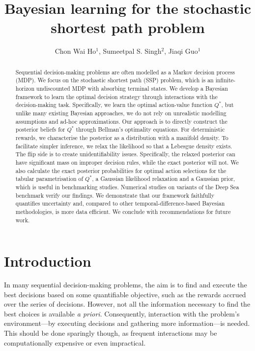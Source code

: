 \documentclass{amsart}
\begin{document}
\title{Bayesian learning for the stochastic shortest path problem}
\author{Chon Wai Ho$^1$, Sumeetpal S. Singh$^2$, Jiaqi Guo$^1$}

\address{$^1$Department of Engineering, University of Cambridge, UK}
\address{$^2$School of Mathematics and Physics, University
 of Wollongong, Wollongong, Australia}

\begin{abstract}

 Sequential decision-making problems are often modelled as a Markov decision process (MDP). We focus on the stochastic shortest path (SSP) problem, which is an infinite-horizon undiscounted MDP with absorbing terminal states. We develop a Bayesian framework to learn the optimal decision strategy through interactions with the decision-making task. Specifically, we learn the optimal action-value function $Q^*$, but unlike many existing Bayesian approaches, we do not rely on unrealistic modelling assumptions and ad-hoc approximations. Our approach is to directly construct the posterior beliefs for $Q^*$ through  Bellman's optimality equations. For deterministic rewards, we characterise the posterior as a distribution with a manifold density. To facilitate simpler inference, we relax the likelihood so that a Lebesgue density exists. The flip side is to create unidentifiability issues. Specifically, the relaxed posterior can have
significant mass on improper decision rules, while the exact posterior will not. 
 We also calculate the exact posterior probabilities for optimal action selections for the tabular parametrisation of $Q^*$, a Gaussian likelihood relaxation and a Gaussian prior, which is useful in benchmarking studies. Numerical studies on variants of the Deep Sea benchmark verify our findings. We demonstrate that our framework faithfully quantifies uncertainty and, compared to other temporal-difference-based Bayesian methodologies, is more data efficient. We conclude with recommendations for future work.
\end{abstract}

\maketitle


\section{Introduction}
In many sequential decision-making problems, the aim is to find and execute the best decisions based on some quantifiable objective, such as the rewards accrued over the series of decisions. However, not all the information necessary to find the best choices is available \textit{a priori}. Consequently, interaction with the problem's environment---by executing decisions and gathering more information---is needed. This should be done sparingly though, as frequent interactions may be computationally expensive or even impractical.
\end{document}
